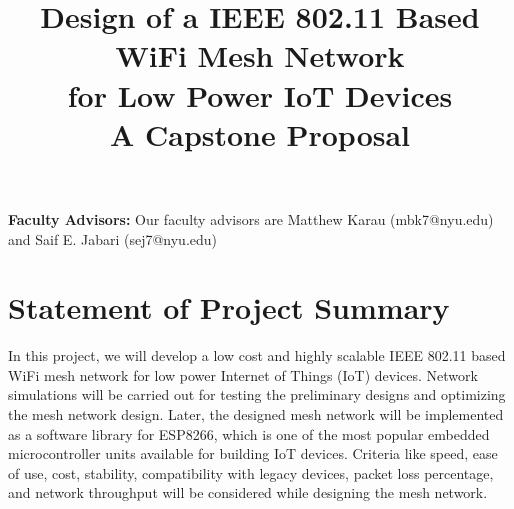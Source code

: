 \documentclass[conference]{IEEEtran}
\begin{document}
\title{\LARGE Design of a IEEE 802.11 Based WiFi Mesh Network \\ for Low Power IoT Devices\\
{\Large A Capstone Proposal}
}

\author{
    
    \and
    
}


\maketitle


\noindent \textbf{Faculty Advisors:}
Our faculty advisors are Matthew Karau (mbk7@nyu.edu) and Saif E. Jabari (sej7@nyu.edu)



\section{Statement of Project Summary}
In this project, we will develop a low cost and highly scalable IEEE 802.11 based WiFi mesh network for low power Internet of Things (IoT) devices. Network simulations will be carried out for testing the preliminary designs and optimizing the mesh network design. Later, the designed mesh network will be implemented as a software library for ESP8266, which is one of the most popular embedded microcontroller units available for building IoT devices. Criteria like speed, ease of use, cost, stability, compatibility with legacy devices, packet loss percentage, and network throughput will be considered while designing the mesh network.\\
\end{document}
